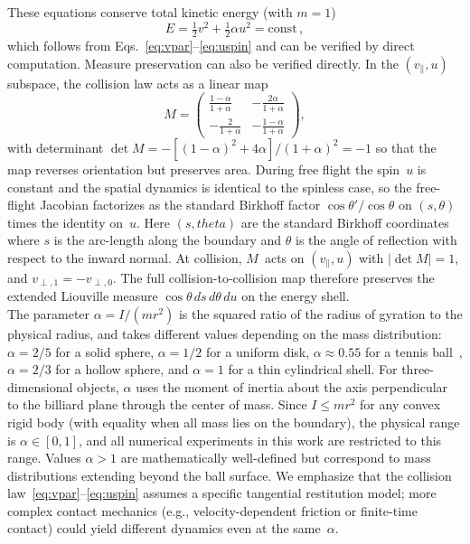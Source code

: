 \documentclass[aps,prd,twocolumn,superscriptaddress,nofootinbib,floatfix]{revtex4-2}
\begin{document}
\noindent
These equations conserve total kinetic energy (with $m=1$)
\begin{equation}
    E = \tfrac{1}{2} v^2 + \tfrac{1}{2}\alpha u^2 = \text{const}\,,\label{eq:energy}
\end{equation}
which follows from Eqs.~\eqref{eq:vpar}--\eqref{eq:uspin} and can be verified by direct computation.
Measure preservation can also be verified directly. In the $(v_\parallel, u)$ subspace, the collision law acts as a linear map 
\begin{equation}
    M = \begin{pmatrix}
        \frac{1-\alpha}{1+\alpha} & -\frac{2\alpha}{1+\alpha} \\[4pt]
        -\frac{2}{1+\alpha} & -\frac{1-\alpha}{1+\alpha}
    \end{pmatrix},
    \label{eq:jacobian}
\end{equation}
with determinant $\det M = -[(1-\alpha)^2 + 4\alpha]/(1+\alpha)^2 = -1$ so that the map reverses orientation but preserves area. During free flight the spin~$u$ is constant and the spatial dynamics is identical to the spinless case, so the free-flight Jacobian factorizes as the standard Birkhoff factor $\cos\theta'/\cos\theta$ on $(s,\theta)$ times the identity on~$u$. Here $(s,theta)$ are the standard Birkhoff coordinates where $s$ is the arc-length along the boundary and $\theta$ is the angle of reflection with respect to the inward normal. At collision, $M$~acts on $(v_\parallel, u)$ with $|\det M|=1$, and $v_{\perp,1}=-v_{\perp,0}$. The full collision-to-collision map therefore preserves the extended Liouville measure $\cos\theta\,ds\,d\theta\,du$ on the energy shell.\\

\noindent
The parameter $\alpha = I/(mr^2)$ is the squared ratio of the radius of gyration to the physical radius, and takes different values depending on the mass distribution: $\alpha=2/5$ for a solid sphere, $\alpha=1/2$ for a uniform disk, $\alpha\approx 0.55$ for a tennis ball~\cite{cross2005}, $\alpha=2/3$ for a hollow sphere, and $\alpha=1$ for a thin cylindrical shell. For three-dimensional objects, $\alpha$ uses the moment of inertia about the axis perpendicular to the billiard plane through the center of mass. Since $I \le mr^2$ for any convex rigid body (with equality when all mass lies on the boundary), the physical range is $\alpha \in [0, 1]$, and all numerical experiments in this work are restricted to this range. Values $\alpha > 1$ are mathematically well-defined but correspond to mass distributions extending beyond the ball surface. We emphasize that the collision law~\eqref{eq:vpar}--\eqref{eq:uspin} assumes a specific tangential restitution model; more complex contact mechanics (e.g., velocity-dependent friction or finite-time contact) could yield different dynamics even at the same~$\alpha$.
\end{document}
